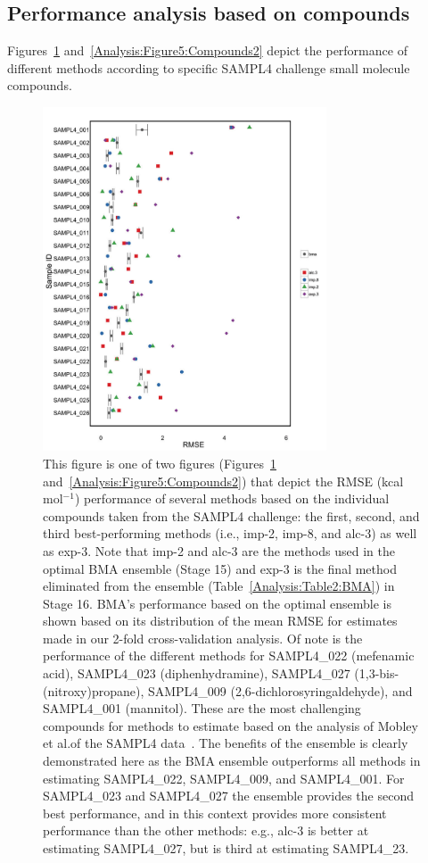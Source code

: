 \documentclass[journal=jpcbfk, manuscript=article]{achemso}
\newcommand{\+}[1]{\ensuremath{\mathbf{#1}}}
\newcommand{\todo}[1]{\textbf{$\star \star$ {#1} $\star \star$}}
\newcommand{\rev}[1]{#1}
\begin{document}
\subsection{Performance \rev{analysis based on compounds}}
\label{Results:BMA_Molecules}
Figures~\ref{Analysis:Figure4:Compounds1} and~\ref{Analysis:Figure5:Compounds2} depict \rev{the} performance of different methods according to specific SAMPL4 challenge small molecule compounds.
\begin{figure}
	\centering
	\includegraphics[keepaspectratio,width=0.75\textwidth]{Figures/Rev2/error_bar_plot_no_best_split_1}
	\caption{This figure is one of two figures (Figures~\ref{Analysis:Figure4:Compounds1} and~\ref{Analysis:Figure5:Compounds2}) that depict the RMSE (kcal mol$^{-1}$) performance of several methods based on the individual compounds taken from the SAMPL4 challenge: the first, second, and third \rev{best-}performing methods (i.e., imp-2, imp-8, and alc-3) as well as exp-3.
	Note that imp-2 and alc-3 are the methods used in the optimal BMA ensemble (Stage 15) and exp-3 is the final method eliminated from the ensemble (Table~\ref{Analysis:Table2:BMA}) in Stage 16.
	BMA's performance based on the optimal ensemble is shown based on its distribution of the mean \rev{RMSE} for estimates made in our 2-fold cross-validation analysis.
	Of note is the performance of the different methods for SAMPL4\_022 (mefenamic acid), SAMPL4\_023 (diphenhydramine), SAMPL4\_027 (1,3-bis-(nitroxy)propane), SAMPL4\_009 (2,6-dichlorosyringaldehyde), and SAMPL4\_001 (mannitol).
	These are the most challenging compounds for methods to estimate based on the analysis of Mobley et al.\@ of the SAMPL4 data~\cite{Mobley:2014}.
	The benefits of the ensemble is clearly demonstrated here as the BMA ensemble outperforms all methods in estimating SAMPL4\_022, SAMPL4\_009, and SAMPL4\_001.
	For SAMPL4\_023 and SAMPL4\_027 the ensemble provides the second best performance, and in this context provides more consistent performance than the other methods: e.g., alc-3 is better at estimating SAMPL4\_027, but is third at estimating SAMPL4\_23.}
\label{Analysis:Figure4:Compounds1}
\end{figure}
\end{document}
